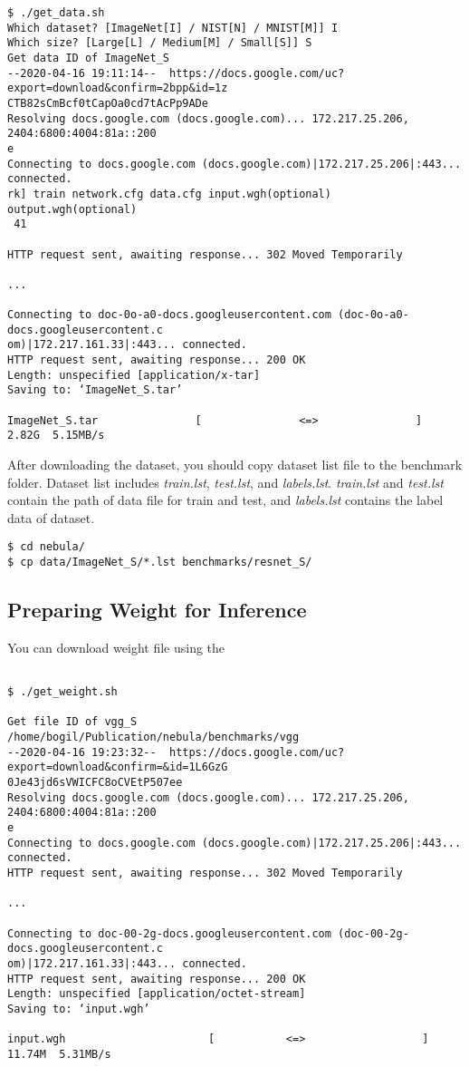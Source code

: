 \documentclass[10pt]{article}
\begin{document}
\begin{Verbatim}[frame=single,fontsize=\small]
$ ./get_data.sh
Which dataset? [ImageNet[I] / NIST[N] / MNIST[M]] I
Which size? [Large[L] / Medium[M] / Small[S]] S
Get data ID of ImageNet_S
--2020-04-16 19:11:14--  https://docs.google.com/uc?export=download&confirm=2bpp&id=1z
CTB82sCmBcf0tCapOa0cd7tAcPp9ADe
Resolving docs.google.com (docs.google.com)... 172.217.25.206, 2404:6800:4004:81a::200
e
Connecting to docs.google.com (docs.google.com)|172.217.25.206|:443... connected.
rk] train network.cfg data.cfg input.wgh(optional) output.wgh(optional)
 41 

HTTP request sent, awaiting response... 302 Moved Temporarily

...

Connecting to doc-0o-a0-docs.googleusercontent.com (doc-0o-a0-docs.googleusercontent.c
om)|172.217.161.33|:443... connected.
HTTP request sent, awaiting response... 200 OK
Length: unspecified [application/x-tar]
Saving to: ‘ImageNet_S.tar’

ImageNet_S.tar               [               <=>               ]   2.82G  5.15MB/s  

\end{Verbatim}

After downloading the dataset, you should copy dataset list file to the benchmark folder.
Dataset list includes \emph{train.lst}, \emph{test.lst}, and \emph{labels.lst}.
\emph{train.lst} and \emph{test.lst} contain the path of data file for train and test, and \emph{labels.lst} contains the label data of dataset.

\begin{Verbatim}[frame=single,fontsize=\small]
$ cd nebula/
$ cp data/ImageNet_S/*.lst benchmarks/resnet_S/
\end{Verbatim}

\subsection{Preparing Weight for Inference} \label{subsec:weight}
You can download weight file using the 

\begin{Verbatim}[frame=single,fontsize=\small]

$ ./get_weight.sh

Get file ID of vgg_S
/home/bogil/Publication/nebula/benchmarks/vgg
--2020-04-16 19:23:32--  https://docs.google.com/uc?export=download&confirm=&id=1L6GzG
0Je43jd6sVWICFC8oCVEtP507ee
Resolving docs.google.com (docs.google.com)... 172.217.25.206, 2404:6800:4004:81a::200
e
Connecting to docs.google.com (docs.google.com)|172.217.25.206|:443... connected.
HTTP request sent, awaiting response... 302 Moved Temporarily

...

Connecting to doc-00-2g-docs.googleusercontent.com (doc-00-2g-docs.googleusercontent.c
om)|172.217.161.33|:443... connected.
HTTP request sent, awaiting response... 200 OK
Length: unspecified [application/octet-stream]
Saving to: ‘input.wgh’

input.wgh                      [           <=>                  ]  11.74M  5.31MB/s

\end{Verbatim}
\end{document}
